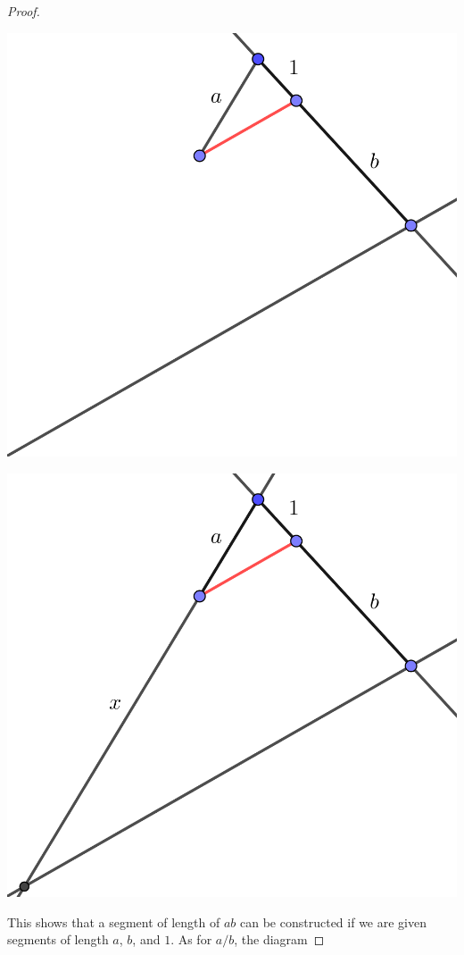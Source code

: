 \documentclass[11pt]{article}
\theoremstyle{definition}
\begin{document}
\begin{proof}
\begin{center}
    \includegraphics[scale=.75]{Images/ab_3.png}
  \end{center}
  \begin{center}
    \includegraphics[scale=.75]{Images/ab_4.png}
  \end{center}
  This shows that a segment of length of $ab$ can be constructed if we are given segments of length $a$, $b$, and $1$. As for $a/b$, the diagram

\end{proof}
\end{document}
